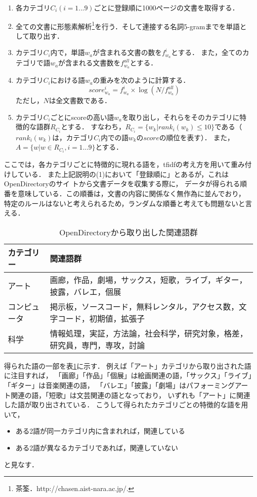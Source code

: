 \documentclass[japanese]{jnlp_1.3a}
\begin{document}
\begin{enumerate}
\item 各カテゴリ$C_i(i=1...9)$ごとに登録順に1000ページの文書を取得する．
\item 全ての文書に形態素解析\footnote{茶筌．http://chasen.aist-nara.ac.jp/.}を行う．そして連接する名詞5-gramまでを単語として取り出す\cite{Manning99}．
\item カテゴリ$C_i$内で，単語$w_a$が含まれる文書の数を$f^i_{w_a}$とする．
また，全てのカテゴリで語$w_a$が含まれる文書数を$f^{all}_{w_a}$とする．
\item カテゴリ$C_i$における語$w_a$の重みを次のように計算する．
\begin{equation}
score^i_{w_a} = f^i_{w_a} \times \log (N/f^{all}_{w_a})
\label{tfidf}
\end{equation}
ただし，$N$は全文書数である．
\item カテゴリ$C_i$ごとにscoreの高い語$w_a$を取り出し，それらをそのカテゴリに特徴的な語群$R_{C_i}$とする．
すなわち，$R_{C_i} = \{w_k | rank_i(w_k) \leq 10\}$である（$rank_i(w_k)は，カテゴリC_i内での語w_kのscoreの順位を表す$）．
また，$A=\{w| w \in R_{C_i}, i=1...9\}$とする．
\end{enumerate}
ここでは，各カテゴリごとに特徴的に現れる語を，tfidfの考え方を用いて重み付けしている．
また上記説明の(1)において「登録順に」とあるが，これはOpenDirectoryのサイ
トから文書データを収集する際に，
データが得られる順番を意味している．この順番は，文書の内容に関係なく無作為に並んでおり，
特定のルールはないと考えられるため，ランダムな順番と考えても問題ないと言える．




\begin{table}[b]
\caption{OpenDirectoryから取り出した関連語群}
\label{wordlist}
\begin{center}
\begin{tabular}{l l}
\hline
カテゴリー & 関連語群 \\ \hline
アート & 画廊，作品，劇場，サックス，短歌，ライブ，ギター，披露，バレエ，個展 \\
コンピュータ & 掲示板，ソースコード，無料レンタル，アクセス数，文字コード，初期値，拡張子 \\
科学 & 情報処理，実証，方法論，社会科学，研究対象，格差，研究員，専門，専攻，討論
 \\ \hline
\end{tabular}
\end{center}
\end{table}


得られた語の一部を表\ref{wordlist}に示す．
例えば「アート」カテゴリから取り出された語に注目すれば，
「画廊」「作品」「個展」は絵画関連の語，「サックス」「ライブ」「ギター」は音楽関連の語，
「バレエ」「披露」「劇場」はパフォーミングアート関連の語，「短歌」は文芸関連の語となっており，
いずれも「アート」に関連した語が取り出されている．
こうして得られたカテゴリごとの特徴的な語を用いて，
\begin{itemize}
\item ある2語が同一カテゴリ内に含まれれば，関連している
\item ある2語が異なるカテゴリであれば，関連していない
\end{itemize}
と見なす．
\end{document}
